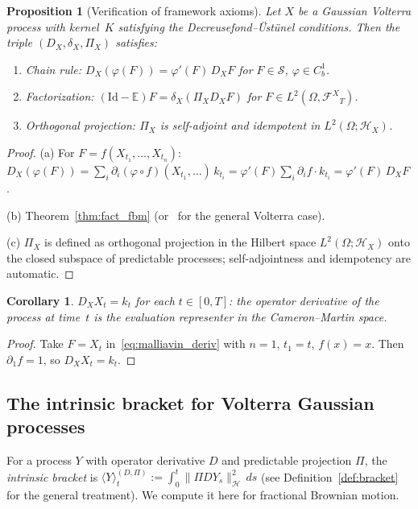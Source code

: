 \documentclass[11pt,a4paper]{article}
\theoremstyle{plain}
\newtheorem{proposition}[theorem]{Proposition}
\newtheorem{corollary}[theorem]{Corollary}
\theoremstyle{definition}
\theoremstyle{remark}
\newcommand{\E}{\mathbb{E}}
\newcommand{\Id}{\mathrm{Id}}
\newcommand{\HX}{\mathcal{H}_X}
\newcommand{\FX}{\mathcal{F}^X}
\begin{document}
\begin{proposition}[Verification of framework axioms]\label{prop:volterra_verif}
Let $X$ be a Gaussian Volterra process with kernel~$K$ satisfying the Decreusefond--\"Ust\"unel conditions. Then the triple $(D_X, \delta_X, \Pi_X)$ satisfies:
\begin{enumerate}[label=\textup{(\alph*)}]
\item \textup{Chain rule:} $D_X(\varphi(F)) = \varphi'(F)\,D_XF$ for $F \in \mathcal{S}$, $\varphi \in C_b^1$.
\item \textup{Factorization:} $(\Id-\E)F = \delta_X(\Pi_X D_X F)$ for $F \in L^2(\Omega,{\FX}_T)$.
\item \textup{Orthogonal projection:} $\Pi_X$ is self-adjoint and idempotent in $L^2(\Omega;\HX)$.
\end{enumerate}
\end{proposition}

\begin{proof}
(a) For $F = f(X_{t_1},\ldots,X_{t_n})$: $D_X(\varphi(F)) = \sum_i \partial_i(\varphi\circ f)(X_{t_1},\ldots)\,k_{t_i} = \varphi'(F)\sum_i\partial_if\cdot k_{t_i} = \varphi'(F)\,D_XF$.

(b) Theorem~\ref{thm:fact_fbm} (or~\cite[Theorem 3.1]{Decreusefond1999} for the general Volterra case).

(c) $\Pi_X$ is defined as orthogonal projection in the Hilbert space $L^2(\Omega;\HX)$ onto the closed subspace of predictable processes; self-adjointness and idempotency are automatic.
\end{proof}

\begin{corollary}\label{cor:DX_process}
$D_XX_t = k_t$ for each $t \in [0,T]$: the operator derivative of the process at time~$t$ is the evaluation representer in the Cameron--Martin space.
\end{corollary}

\begin{proof}
Take $F = X_t$ in~\eqref{eq:malliavin_deriv} with $n = 1$, $t_1 = t$, $f(x) = x$. Then $\partial_1 f = 1$, so $D_XX_t = k_t$.
\end{proof}


\subsection{The intrinsic bracket for Volterra Gaussian processes}\label{ssec:bracket_volterra}

For a process $Y$ with operator derivative $D$ and predictable projection $\Pi$, the \emph{intrinsic bracket} is $\langle Y\rangle_t^{(D,\Pi)} := \int_0^t\|\Pi DY_s\|^2_{\mathcal{H}}\,ds$ (see Definition~\ref{def:bracket} for the general treatment). We compute it here for fractional Brownian motion.
\end{document}
